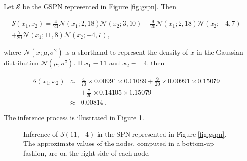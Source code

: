 \begin{example}
  Let $\mathcal{S}$ be the GSPN represented in Figure \ref{fig:gspn}. Then

  \begin{multline}
    \mathcal{S}(x_1, x_2) = \frac{4}{20} \mathcal{N}(x_1; 2, 18) \mathcal{N}(x_2; 3, 10) + \frac{9}{20} \mathcal{N}(x_1; 2, 18) \mathcal{N}(x_2; -4, 7) \\
    + \frac{7}{20} \mathcal{N}(x_1; 11, 8) \mathcal{N}(x_2; -4, 7),
    \label{eq:spninference}
  \end{multline}

  \noindent where $\mathcal{N}(x; \mu, \sigma^2)$ is a shorthand to represent the density of $x$ in the Gaussian distribution $\mathcal{N}(\mu, \sigma^2)$. If $x_1 = 11$ and $x_2 = -4$, then

  \begin{eqnarray*}
    \mathcal{S}(x_1, x_2) & \approx & \frac{4}{20} \times 0.00991 \times 0.01089 + \frac{9}{20} \times 0.00991 \times 0.15079 \\
    & & + \frac{7}{20} \times 0.14105 \times 0.15079 \\
    & \approx & 0.00814 \, .
  \end{eqnarray*}

  The inference process is illustrated in Figure \ref{fig:spninference}.
\end{example}

\begin{figure}
  \centering

  \caption[Marginal inference in a GSPN]{Inference of $\mathcal{S}(11, -4)$ in the SPN represented in Figure \ref{fig:gspn}. The approximate values of the nodes, computed in a bottom-up fashion, are on the right side of each node.}
  \label{fig:spninference}
\end{figure}

